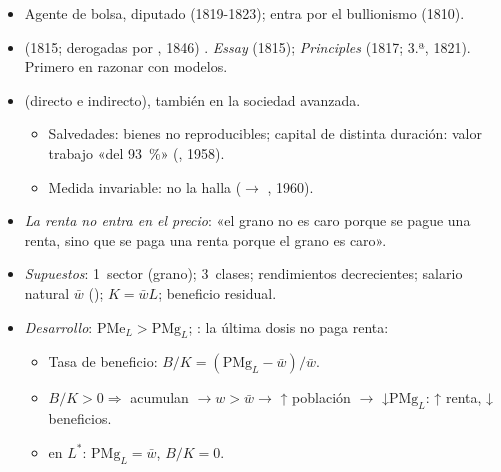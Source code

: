 \documentclass{article}
\begin{document}
\begin{columnas}
\begin{itemize}
\item Agente de bolsa, diputado (1819-1823); entra por el bullionismo (1810).
\item {} (1815; derogadas por , 1846) . \emph{Essay} (1815); \emph{Principles} (1817; 3.ª, 1821). Primero en razonar con modelos.
\end{itemize}
\begin{itemize}
\item {} (directo e indirecto), también en la sociedad avanzada.
  \begin{itemize}
  \item Salvedades: bienes no reproducibles; capital de distinta duración: valor trabajo «del 93~\%» (, 1958).
  \item Medida invariable: no la halla ($\to$ , 1960).
  \end{itemize}
\item \emph{La renta no entra en el precio}: «el grano no es caro porque se pague una renta, sino que se paga una renta porque el grano es caro».
\end{itemize}
\begin{itemize}
\item \emph{Supuestos}: 1~sector (grano); 3~clases; rendimientos decrecientes; salario natural $\bar w$ (); $K=\bar wL$; beneficio residual.
\item \emph{Desarrollo}: $\mathrm{PMe}_L>\mathrm{PMg}_L$; : la última dosis no paga renta:
  \begin{itemize}
  \item Tasa de beneficio: $B/K=(\mathrm{PMg}_L-\bar w)/\bar w$.
  \item $B/K>0\Rightarrow$ acumulan $\to w>\bar w\to$ ↑ población $\to$ ↓$\mathrm{PMg}_L$: ↑ renta, ↓ beneficios.
  \item {} en $L^*$: $\mathrm{PMg}_L=\bar w$, $B/K=0$.
  \end{itemize}
\end{itemize}

\end{columnas}
\end{document}
